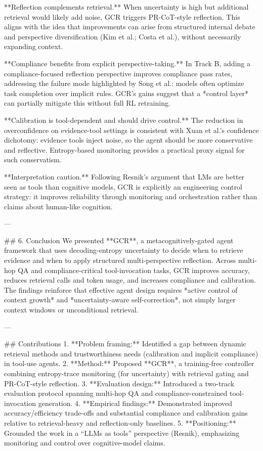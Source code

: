 **Reflection complements retrieval.** When uncertainty is high but additional retrieval would likely add noise, GCR triggers PR-CoT-style reflection. This aligns with the idea that improvements can arise from structured internal debate and perspective diversification (Kim et al.; Costa et al.), without necessarily expanding context.

**Compliance benefits from explicit perspective-taking.** In Track B, adding a compliance-focused reflection perspective improves compliance pass rates, addressing the failure mode highlighted by Song et al.: models often optimize task completion over implicit rules. GCR’s gains suggest that a *control layer* can partially mitigate this without full RL retraining.

**Calibration is tool-dependent and should drive control.** The reduction in overconfidence on evidence-tool settings is consistent with Xuan et al.’s confidence dichotomy: evidence tools inject noise, so the agent should be more conservative and reflective. Entropy-based monitoring provides a practical proxy signal for such conservatism.

**Interpretation caution.** Following Resnik’s argument that LMs are better seen as tools than cognitive models, GCR is explicitly an engineering control strategy: it improves reliability through monitoring and orchestration rather than claims about human-like cognition.

---

## 6. Conclusion  
We presented **GCR**, a metacognitively-gated agent framework that uses decoding-entropy uncertainty to decide when to retrieve evidence and when to apply structured multi-perspective reflection. Across multi-hop QA and compliance-critical tool-invocation tasks, GCR improves accuracy, reduces retrieval calls and token usage, and increases compliance and calibration. The findings reinforce that effective agent design requires *active control of context growth* and *uncertainty-aware self-correction*, not simply larger context windows or unconditional retrieval.

---

## Contributions  
1. **Problem framing:** Identified a gap between dynamic retrieval methods and trustworthiness needs (calibration and implicit compliance) in tool-use agents.  
2. **Method:** Proposed **GCR**, a training-free controller combining entropy-trace monitoring (for uncertainty) with retrieval gating and PR-CoT-style reflection.  
3. **Evaluation design:** Introduced a two-track evaluation protocol spanning multi-hop QA and compliance-constrained tool-invocation generation.  
4. **Empirical findings:** Demonstrated improved accuracy/efficiency trade-offs and substantial compliance and calibration gains relative to retrieval-heavy and reflection-only baselines.  
5. **Positioning:** Grounded the work in a “LLMs as tools” perspective (Resnik), emphasizing monitoring and control over cognitive-model claims.
